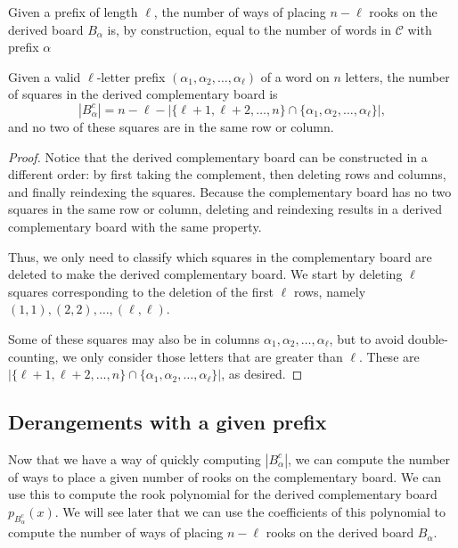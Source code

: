 Given a prefix of length $\ell$, the number of ways of placing $n - \ell$ rooks
on the derived board $B_\alpha$ is, by construction,
equal to the number of words in $\mathcal{C}$ with prefix $\alpha$
\begin{lemma}
  Given a valid $\ell$-letter prefix $(\alpha_1, \alpha_2, \dots, \alpha_\ell)$
  of a word on $n$ letters,
  the number of squares in the derived complementary board is \begin{equation}
    |B_\alpha^c| = n - \ell - |\{\ell+1, \ell+2, \dots, n\} \cap \{\alpha_1, \alpha_2, \dots, \alpha_\ell\}|,
  \end{equation} and no two of these squares are in the same row or column.
  \label{lemma:derangementComplementSize}
\end{lemma}
\begin{proof}
  Notice that the derived complementary board can be constructed in a different
  order: by first taking the complement, then deleting rows and columns, and
  finally reindexing the squares.
  Because the complementary board has no two squares in the same row or column,
  deleting and reindexing results in a derived complementary board with the same
  property.

  Thus, we only need to classify which squares in the complementary board are
  deleted to make the derived complementary board.
  We start by deleting $\ell$ squares corresponding to the deletion of the first
  $\ell$ rows, namely $(1, 1), (2, 2), \dots, (\ell, \ell)$.

  Some of these squares may also be in columns
  $\alpha_1, \alpha_2, \dots, \alpha_\ell$, but to avoid double-counting, we
  only consider those letters that are greater than $\ell$. These are
  $|\{\ell+1, \ell+2, \dots, n\} \cap \{\alpha_1, \alpha_2, \dots, \alpha_\ell\}|$,
  as desired.
\end{proof}

\subsection{Derangements with a given prefix}
Now that we have a way of quickly computing $|B_\alpha^c|$, we can compute the
number of ways to place a given number of rooks on the complementary board.
We can use this
to compute the rook polynomial for the derived complementary board
$p_{B_\alpha^c}(x)$.
We will see later that we can use the coefficients of this polynomial to compute
the number of ways of placing $n - \ell$ rooks on the derived board $B_\alpha$.

